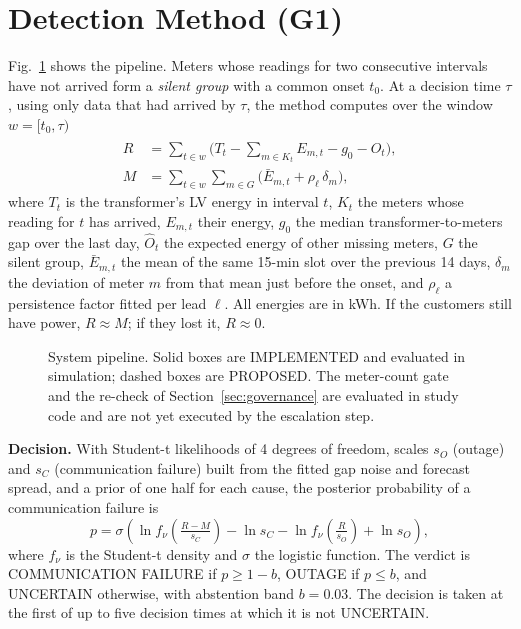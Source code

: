 \section{Detection Method (G1)}\label{sec:method}
Fig.~\ref{fig:pipeline} shows the pipeline. Meters whose readings for two consecutive intervals have
not arrived form a \emph{silent group} with a common onset $t_0$. At a decision time $\tau$, using only
data that had arrived by $\tau$, the method computes over the window $w=[t_0,\tau)$
\begin{align}
R &= \textstyle\sum_{t\in w}\big(T_t - \sum_{m\in K_t} E_{m,t} - g_0 - \hat{O}_t\big), \label{eq:R}\\
M &= \textstyle\sum_{t\in w}\sum_{m\in G}\big(\bar{E}_{m,t} + \rho_{\ell}\,\delta_{m}\big), \label{eq:M}
\end{align}
where $T_t$ is the transformer's LV energy in interval $t$, $K_t$ the meters whose reading for $t$
has arrived, $E_{m,t}$ their energy, $g_0$ the median transformer-to-meters gap over the last day,
$\hat{O}_t$ the expected energy of other missing meters, $G$ the silent group, $\bar{E}_{m,t}$ the mean
of the same 15-min slot over the previous 14 days, $\delta_m$ the deviation of meter $m$ from that
mean just before the onset, and $\rho_\ell$ a persistence factor fitted per lead $\ell$. All energies
are in kWh. If the customers still have power, $R \approx M$; if they lost it, $R \approx 0$.

\begin{figure}[!t]
\centering

\caption{System pipeline. Solid boxes are IMPLEMENTED and evaluated in simulation; dashed boxes are
PROPOSED. The meter-count gate and the re-check of Section~\ref{sec:governance} are evaluated in study
code and are not yet executed by the escalation step.}\label{fig:pipeline}
\end{figure}

\textbf{Decision.} With Student-t likelihoods of 4 degrees of freedom, scales $s_O$ (outage) and
$s_C$ (communication failure) built from the fitted gap noise and forecast spread, and a prior of
one half for each cause, the posterior probability of a communication failure is
\begin{equation}
p = \sigma\!\left(\ln f_\nu\!\left(\tfrac{R-M}{s_C}\right) - \ln s_C - \ln f_\nu\!\left(\tfrac{R}{s_O}\right) + \ln s_O\right), \label{eq:p}
\end{equation}
where $f_\nu$ is the Student-t density and $\sigma$ the logistic function. The verdict is
COMMUNICATION FAILURE if $p \ge 1-b$, OUTAGE if $p \le b$, and UNCERTAIN otherwise, with abstention
band $b = 0.03$. The decision is taken at the first of up to five decision times at which it is not
UNCERTAIN.

